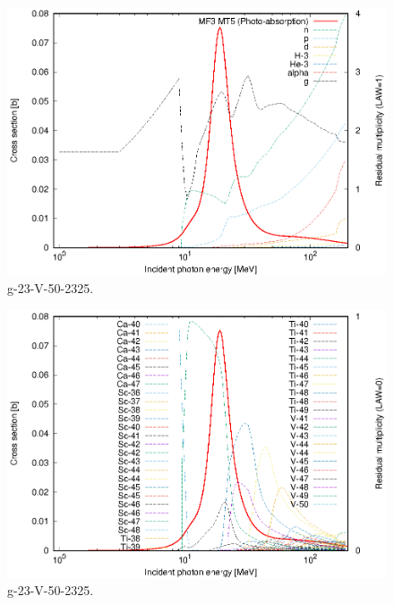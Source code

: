 \begin{figure}
 \includegraphics[width=\linewidth]{eps/g_23-V-50_2325.eps}
  \caption{g-23-V-50-2325.}
\end{figure}
\begin{figure}
 \includegraphics[width=\linewidth]{eps-law0/g_23-V-50_2325.eps}
 \caption{g-23-V-50-2325.}
\end{figure}
\newpage \clearpage

